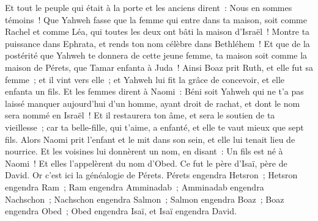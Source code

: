 \begin{multicols}{2}
Et tout le peuple qui était à la porte et les anciens dirent~: Nous en sommes témoins~! Que Yahweh fasse que la femme qui entre dans ta maison, soit comme Rachel et comme Léa, qui toutes les deux ont bâti la maison d'Israël~! Montre ta puissance dans Ephrata, et rends ton nom célèbre dans Bethléhem~!
Et que de la postérité que Yahweh te donnera de cette jeune femme, ta maison soit comme la maison de Pérets, que Tamar enfanta à Juda~!
Ainsi Boaz prit Ruth, et elle fut sa femme~; et il vint vers elle~; et Yahweh lui fit la grâce de concevoir, et elle enfanta un fils.
Et les femmes dirent à Naomi~: Béni soit Yahweh qui ne t'a pas laissé manquer aujourd'hui d'un homme, ayant droit de rachat, et dont le nom sera nommé en Israël~!
Et il restaurera ton âme, et sera le soutien de ta vieillesse~; car ta belle-fille, qui t'aime, a enfanté, et elle te vaut mieux que sept fils.
Alors Naomi prit l'enfant et le mit dans son sein, et elle lui tenait lieu de nourrice.
Et les voisines lui donnèrent un nom, en disant~: Un fils est né à Naomi~! Et elles l'appelèrent du nom d'Obed. Ce fut le père d'Isaï, père de David.
Or c'est ici la généalogie de Pérets. Pérets engendra Hetsron~;
Hetsron engendra Ram~; Ram engendra Amminadab~;
Amminadab engendra Nachschon~; Nachschon engendra Salmon~;
Salmon engendra Boaz~; Boaz engendra Obed~;
Obed engendra Isaï, et Isaï engendra David.
\PPE{}
\end{multicols}
